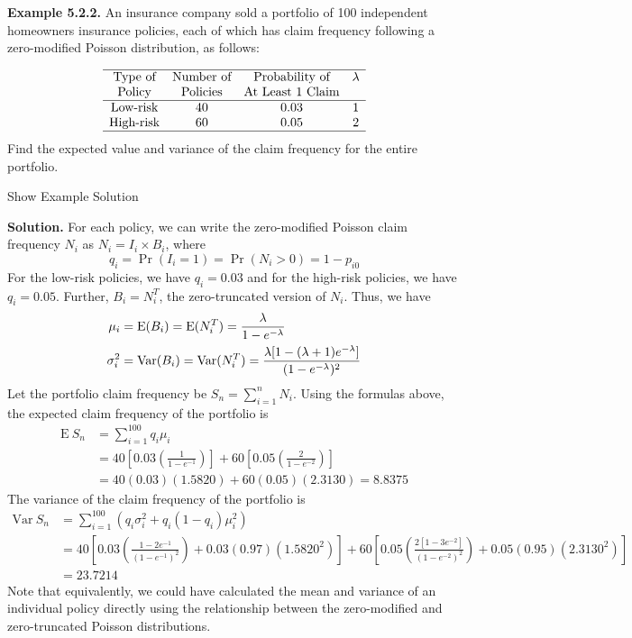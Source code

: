 \documentclass[]{book}
\theoremstyle{definition}
\theoremstyle{definition}
\theoremstyle{definition}
\theoremstyle{remark}
\begin{document}
\textbf{Example 5.2.2.} An insurance company sold a portfolio of 100
independent homeowners insurance policies, each of which has claim
frequency following a zero-modified Poisson distribution, as follows:

\[\begin{matrix}
    \begin{array}{cccc} \hline
        \text{Type of} & \text{Number of}  & \text{Probability of} & \lambda \\
        \text{Policy} & \text{Policies}  &  \text{At Least 1 Claim} &  \\ \hline
        \text{Low-risk} & 40 & 0.03 & 1 \\
        \text{High-risk} & 60 & 0.05 & 2 \\ \hline
    \end{array}
\end{matrix}\] Find the expected value and variance of the claim
frequency for the entire portfolio.

Show Example Solution

\hypertarget{toggleExampleAggLoss.2.2}{}
\textbf{Solution.} For each policy, we can write the zero-modified
Poisson claim frequency \(N_i\) as \(N_i = I_i \times B_i\), where
\[q_i = \Pr(I_i = 1) = \Pr(N_i > 0) = 1-p_{i0}\] For the low-risk
policies, we have \(q_i = 0.03\) and for the high-risk policies, we have
\(q_i=0.05\). Further, \(B_i = N_i^T\), the zero-truncated version of
\(N_i\). Thus, we have \[\begin{aligned}
\mu_i &={\rm E}(B_i) = {\rm E}(N_i^T) = \frac{\lambda}{1-e^{-\lambda}} \\
\sigma_i^2 &={\rm Var}(B_i) = {\rm Var}(N_i^T) = \frac{\lambda [1-(\lambda+1)e^{-\lambda}]}{(1-e^{-\lambda})^2}
\end{aligned}\] Let the portfolio claim frequency be
\(S_n = \sum_{i=1}^n N_i\). Using the formulas above, the expected claim
frequency of the portfolio is \[\begin{aligned}
    \mathrm{E~} S_n &= \sum_{i=1}^{100} q_i \mu_i \\
    & = 40\left[0.03 \left(\frac{1}{1-e^{-1}} \right) \right] + 60 \left[0.05 \left( \frac{2}{1-e^{-2}} \right) \right] \\
    &= 40(0.03)(1.5820) + 60(0.05)(2.3130) = 8.8375
\end{aligned}\] The variance of the claim frequency of the portfolio is
\[\begin{aligned}
    \mathrm{Var~}S_n &= \sum_{i=1}^{100} \left( q_i \sigma _i^2+q_i (1-q_i
    )\mu_i^2 \right) \\
    &= 40 \left[ 0.03 \left(\frac{1-2e^{-1}}{(1-e^{-1})^2} \right) + 0.03(0.97)(1.5820^2) \right] + 60 \left[0.05 \left( \frac{2[1-3e^{-2}]}{ (1-e^{-2})^2} \right) + 0.05(0.95)(2.3130^2) \right] \\
    &= 23.7214
\end{aligned}\] Note that equivalently, we could have calculated the
mean and variance of an individual policy directly using the
relationship between the zero-modified and zero-truncated Poisson
distributions.
\end{document}
